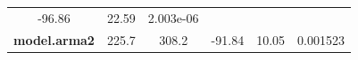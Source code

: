 \documentclass[]{article}
\begin{document}
\begin{longtable}[]{@{}cccccc@{}}
\begin{minipage}[t]{0.10\columnwidth}
-96.86
\strut\end{minipage} &
\begin{minipage}[t]{0.12\columnwidth}\centering\strut
22.59
\strut\end{minipage} &
\begin{minipage}[t]{0.12\columnwidth}\centering\strut
2.003e-06
\strut\end{minipage}\tabularnewline
\begin{minipage}[t]{0.21\columnwidth}\centering\strut
\textbf{model.arma2}
\strut\end{minipage} &
\begin{minipage}[t]{0.07\columnwidth}\centering\strut
225.7
\strut\end{minipage} &
\begin{minipage}[t]{0.07\columnwidth}\centering\strut
308.2
\strut\end{minipage} &
\begin{minipage}[t]{0.10\columnwidth}\centering\strut
-91.84
\strut\end{minipage} &
\begin{minipage}[t]{0.12\columnwidth}\centering\strut
10.05
\strut\end{minipage} &
\begin{minipage}[t]{0.12\columnwidth}\centering\strut
0.001523
\strut\end{minipage}\tabularnewline
\bottomrule
\end{longtable}
\end{document}
